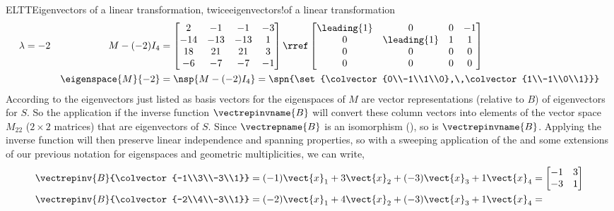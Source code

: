 \begin{example}{ELTT}{Eigenvectors of a linear transformation, twice}{eigenvectors!of a linear transformation}
%
\begin{align*}
\lambda&=-2&M-(-2)I_4&=
\begin{bmatrix}
 2 & -1 & -1 & -3 \\
 -14 & -13 & -13 & 1 \\
 18 & 21 & 21 & 3 \\
 -6 & -7 & -7 & -1
\end{bmatrix}
\rref
\begin{bmatrix}
 \leading{1} & 0 & 0 & -1 \\
 0 & \leading{1} & 1 & 1 \\
 0 & 0 & 0 & 0 \\
 0 & 0 & 0 & 0
\end{bmatrix}\\
&&\eigenspace{M}{-2}&=\nsp{M-(-2)I_4}
=\spn{\set{\colvector{0\\-1\\1\\0},\,\colvector{1\\-1\\0\\1}}}
\end{align*}
%
According to  the eigenvectors just listed as basis vectors for the eigenspaces of $M$ are vector representations (relative to $B$) of eigenvectors for $S$.  So the application if the inverse function $\vectrepinvname{B}$ will convert these column vectors into elements of the vector space $M_{22}$ ($2\times 2$ matrices) that are eigenvectors of $S$.  Since $\vectrepname{B}$ is an isomorphism (), so is $\vectrepinvname{B}$.  Applying the inverse function will then preserve linear independence and spanning properties, so with a sweeping application of the  and some extensions of our previous notation for eigenspaces and geometric multiplicities, we can write,
%
\begin{align*}
\vectrepinv{B}{\colvector{-1\\3\\-3\\1}}
&=
(-1)\vect{x}_1+3\vect{x}_2+(-3)\vect{x}_3+1\vect{x}_4=
\begin{bmatrix}-1 & 3\\-3 & 1\end{bmatrix}\\
%
\vectrepinv{B}{\colvector{-2\\4\\-3\\1}}
&=
(-2)\vect{x}_1+4\vect{x}_2+(-3)\vect{x}_3+1\vect{x}_4=

\end{align*}
\end{example}
